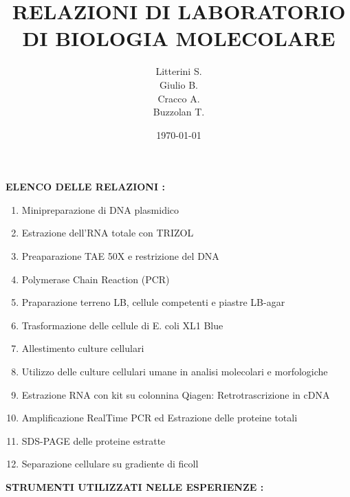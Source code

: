 \documentclass{article}
\begin{document}
	\title{RELAZIONI DI LABORATORIO DI BIOLOGIA MOLECOLARE}

	\author{Litterini S. \\Giulio B. \\Cracco A.\\Buzzolan T. }

	\date{\today}

	\maketitle

	\vspace{1.5cm}

	\large{\textbf{ELENCO DELLE RELAZIONI :}}
	\vspace{0.5cm}

	\begin{enumerate}

		\item Minipreparazione di DNA plasmidico
		\item Estrazione dell'RNA totale con TRIZOL
		\item Preaparazione TAE 50X e restrizione del DNA
		\item Polymerase Chain Reaction (PCR)
		\item Praparazione terreno LB, cellule competenti e piastre LB-agar
		\item Trasformazione delle cellule di E. coli XL1 Blue
		\item Allestimento culture cellulari
		\item Utilizzo delle culture cellulari umane in analisi molecolari e morfologiche
		\item Estrazione RNA con kit su colonnina Qiagen: Retrotrascrizione in cDNA
		\item Amplificazione RealTime PCR ed Estrazione delle proteine totali
		\item SDS-PAGE delle proteine estratte
		\item Separazione cellulare su gradiente di ficoll

	\end{enumerate}

	\newpage


	\large{\textbf{STRUMENTI UTILIZZATI NELLE ESPERIENZE :}}
\end{document}
